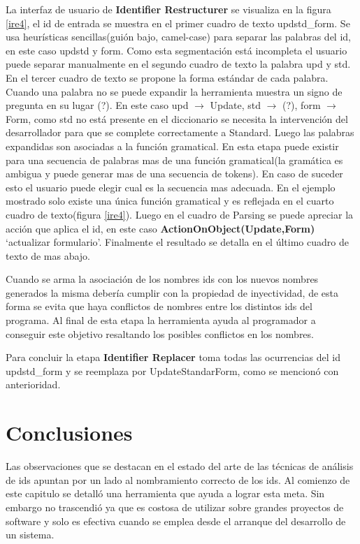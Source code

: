 \documentclass[a4paper,12pt]{report}
\begin{document}
La interfaz de usuario de \textbf{Identifier Restructurer} se visualiza en la figura \ref{ire4}, el id de entrada se muestra en el primer cuadro de texto \textsf{updstd\_form}. Se usa heurísticas sencillas(guión bajo, camel-case) para separar las palabras del id, en este caso \textsf{updstd} y \textsf{form}. Como esta segmentación está incompleta el usuario puede separar manualmente en el segundo cuadro de texto la palabra \textsf{upd} y \textsf{std}. En el tercer cuadro de texto se propone la forma estándar de cada palabra. Cuando una palabra no se puede expandir la herramienta muestra un signo de pregunta en su lugar (?). En este caso \textsf{upd} $\rightarrow$ \textsf{Update}, \textsf{std} $\rightarrow$ (?), \textsf{form} $\rightarrow$ \textsf{Form}, como \textsf{std} no está presente en el diccionario se necesita la intervención del desarrollador para que se complete correctamente a \textsf{Standard}. Luego las palabras expandidas son asociadas a la función gramatical. En esta etapa puede existir para una secuencia de palabras mas de una función gramatical(la gramática es ambigua y puede generar mas de una secuencia de tokens). En caso de suceder esto el usuario puede elegir cual es la secuencia mas adecuada. En el ejemplo mostrado solo existe una única función gramatical y es reflejada en el cuarto cuadro de texto(figura \ref{ire4}). Luego en el cuadro de Parsing se puede apreciar la acción que aplica el id, en este caso \textbf{ActionOnObject(Update,Form)} `actualizar formulario'. Finalmente el resultado se detalla en el último cuadro de texto de mas abajo.

Cuando se arma la asociación de los nombres ids con los nuevos nombres generados la misma debería cumplir con la propiedad de inyectividad, de esta forma se evita que haya conflictos de nombres entre los distintos ids del programa. Al final de esta etapa la herramienta ayuda al programador a conseguir este objetivo resaltando los posibles conflictos en los nombres.

Para concluir la etapa \textbf{Identifier Replacer} toma todas las ocurrencias del id \textsf{updstd\_form} y se reemplaza por \textsf{UpdateStandarForm}, como se mencionó con anterioridad.

\section{Conclusiones}

Las observaciones que se destacan en el estado del arte de las técnicas de análisis de ids apuntan por un lado al nombramiento correcto de los ids. Al comienzo de este capitulo se detalló una herramienta que ayuda a lograr esta meta. Sin embargo no trascendió ya que es costosa de utilizar sobre grandes proyectos de software y solo es efectiva cuando se emplea desde el arranque del desarrollo de un sistema.
\end{document}

